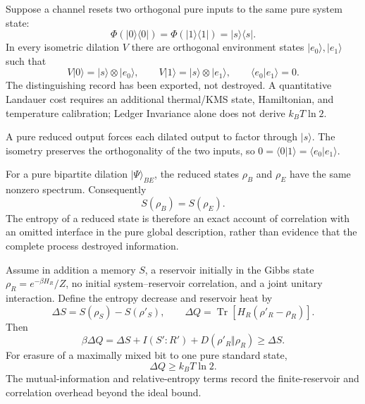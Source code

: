 \begin{theorem}
\label{thm:no-erasure-without-export}
Suppose a channel resets two orthogonal pure inputs to the same pure system state:
\[
 \Phi(|0\rangle\!\langle0|)
 =
 \Phi(|1\rangle\!\langle1|)
 =|s\rangle\!\langle s|.
\]
In every isometric dilation \(V\) there are orthogonal environment states
\(|e_0\rangle,|e_1\rangle\) such that
\[
 V|0\rangle=|s\rangle\otimes|e_0\rangle,
 \qquad
 V|1\rangle=|s\rangle\otimes|e_1\rangle,
 \qquad
 \langle e_0|e_1\rangle=0.
\]
The distinguishing record has been exported, not destroyed.  A quantitative
Landauer cost requires an additional thermal/KMS state, Hamiltonian, and temperature
calibration; Ledger Invariance alone does not derive \(k_BT\ln2\).
\end{theorem}

\begin{proofsketch}
A pure reduced output forces each dilated output to factor through \(|s\rangle\).
The isometry preserves the orthogonality of the two inputs, so
\(0=\langle0|1\rangle=\langle e_0|e_1\rangle\).
\end{proofsketch}


\begin{proposition}
\label{prop:entanglement-account-mixedness}
For a pure bipartite dilation \(\lvert\Psi\rangle_{BE}\), the reduced states
\(\rho_B\) and \(\rho_E\) have the same nonzero spectrum.  Consequently
\[
 \boxed{S(\rho_B)=S(\rho_E).}
\]
The entropy of a reduced state is therefore an exact account of correlation with an
omitted interface in the pure global description, rather than evidence that the
complete process destroyed information.
\end{proposition}

\begin{theorem}
\label{thm:conditional-landauer-ledger}
Assume in addition a memory \(S\), a reservoir initially in the Gibbs state
\(\rho_R=e^{-\beta H_R}/Z\), no initial system--reservoir correlation, and a joint
unitary interaction.  Define the entropy decrease and reservoir heat by
\[
 \Delta S=S(\rho_S)-S(\rho'_S),
 \qquad
 \Delta Q=\operatorname{Tr}\!\left[H_R(\rho'_R-\rho_R)\right].
\]
Then
\[
 \boxed{
 \beta\Delta Q
 =\Delta S+I(S':R')+D(\rho'_R\Vert\rho_R)
 \ge\Delta S.}
\]
For erasure of a maximally mixed bit to one pure standard state,
\[
 \boxed{\Delta Q\ge k_BT\ln2.}
\]
The mutual-information and relative-entropy terms record the finite-reservoir and
correlation overhead beyond the ideal bound.
\end{theorem}

